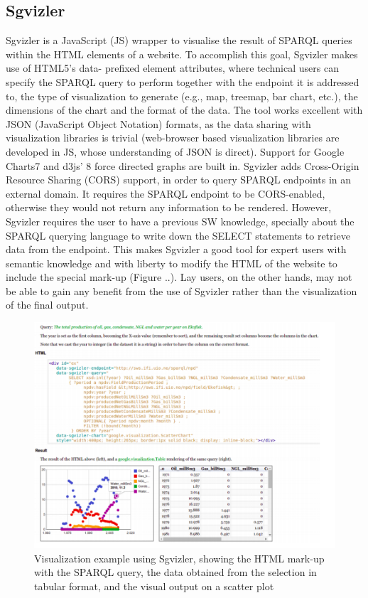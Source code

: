 \documentclass[a4paper,12pt,oneside]{report}
\begin{document}
{{{\subsection{Sgvizler}
{Sgvizler  is a JavaScript (JS) wrapper to visualise the result of SPARQL queries within the HTML elements of a website. To accomplish this goal, Sgvizler makes use of HTML5’s data- prefixed element attributes, where technical users can specify the
SPARQL query to perform together with the endpoint it is addressed to, the type of visualization to generate (e.g., map, treemap, bar chart, etc.), the dimensions of the chart and the format of the data. The tool works excellent with JSON (JavaScript Object Notation) formats, as the data sharing with visualization libraries is trivial (web-browser based visualization libraries are developed in JS, whose understanding of JSON is direct). Support for Google Charts7 and d3js’ 8 force directed graphs are built in.
Sgvizler adds Cross-Origin Resource Sharing (CORS)  support, in order to query SPARQL endpoints in an external domain. It requires the SPARQL endpoint to be CORS-enabled, otherwise they would not return
any information to be rendered. However, Sgvizler requires the user to have a previous SW knowledge, specially about the SPARQL querying language to write down the SELECT statements to retrieve data from the endpoint. This makes Sgvizler a good tool for expert users with semantic knowledge and with liberty to modify the HTML of the website to include the special mark-up (Figure ..). Lay users, on the other hands, may not be able to gain any benefit from the use of Sgvizler rather than the visualization of the final output.
\begin{figure}[h!]
\centering
\includegraphics[width=1\textwidth]{Capture15}
\caption{Visualization example using Sgvizler, showing the HTML mark-up with the SPARQL query, the data obtained from the selection in tabular format, and the visual output on a scatter plot}
\end{figure}
}
}}}
\end{document}
